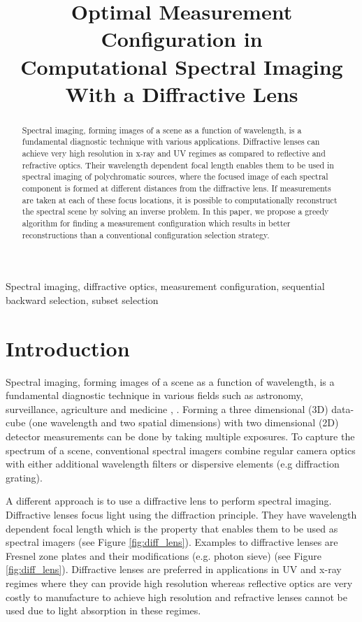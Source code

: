 \documentclass{article}
\title{Optimal Measurement Configuration in \\ Computational Spectral Imaging With a Diffractive Lens}
\begin{document}
\maketitle

\begin{abstract}
Spectral imaging, forming images of a scene as a function of wavelength, is a
fundamental diagnostic technique with various applications. Diffractive lenses
can achieve very high resolution in x-ray and UV regimes as compared to
reflective and refractive optics. Their wavelength dependent focal length
enables them to be used in spectral imaging of polychromatic sources, where the
focused image of each spectral component is formed at different distances from
the diffractive lens. If measurements are taken at each of these focus
locations, it is possible to computationally reconstruct the spectral scene by
solving an inverse problem. In this paper, we propose a greedy algorithm for
finding a measurement configuration which results in better reconstructions than
a conventional configuration selection strategy.
\end{abstract}

\begin{keywords}
Spectral imaging, diffractive optics, measurement configuration, sequential
backward selection, subset selection
\end{keywords}

\section{Introduction}
\label{sec:intro}
Spectral imaging, forming images of a scene as a function of wavelength, is a
fundamental diagnostic technique in various fields such as astronomy,
surveillance, agriculture and medicine \cite{shaw2003spectral},
\cite{garini2006spectral}. Forming a three dimensional (3D) data-cube (one
wavelength and two spatial dimensions) with two dimensional (2D) detector
measurements can be done by taking multiple exposures. To capture the spectrum
of a scene, conventional spectral imagers combine regular camera optics with
either additional wavelength filters or dispersive elements (e.g diffraction
grating).

A different approach is to use a diffractive lens to perform spectral imaging.
Diffractive lenses focus light using the diffraction principle. They have
wavelength dependent focal length which is the property that enables them to be
used as spectral imagers (see Figure \ref{fig:diff_lens}). Examples to
diffractive lenses are Fresnel zone plates and their modifications (e.g. photon
sieve) (see Figure \ref{fig:diff_lens}). Diffractive lenses are preferred in
applications in UV and x-ray regimes where they can provide high resolution
whereas reflective optics are very costly to manufacture to achieve high
resolution and refractive lenses cannot be used due to light absorption in these
regimes.
\end{document}
